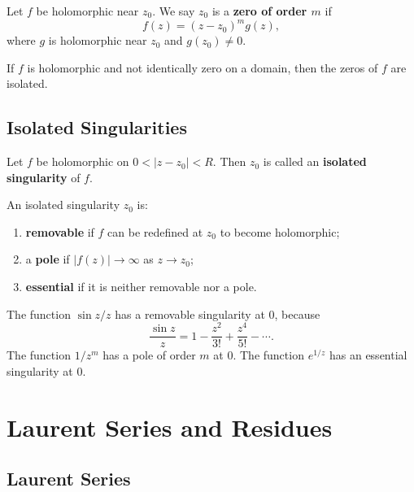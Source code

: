 \begin{definition}
Let $f$ be holomorphic near $z_0$. We say $z_0$ is a \textbf{zero of order $m$} if
\[
    f(z)=(z-z_0)^m g(z),
\]
where $g$ is holomorphic near $z_0$ and $g(z_0)\neq 0$.
\end{definition}

\begin{proposition}
If $f$ is holomorphic and not identically zero on a domain, then the zeros of $f$ are isolated.
\end{proposition}

\subsection{Isolated Singularities}

\begin{definition}
Let $f$ be holomorphic on $0<|z-z_0|<R$. Then $z_0$ is called an \textbf{isolated singularity} of $f$.
\end{definition}

\begin{definition}
An isolated singularity $z_0$ is:
\begin{enumerate}
    \item \textbf{removable} if $f$ can be redefined at $z_0$ to become holomorphic;
    \item a \textbf{pole} if $|f(z)|\to\infty$ as $z\to z_0$;
    \item \textbf{essential} if it is neither removable nor a pole.
\end{enumerate}
\end{definition}

\begin{example}
The function $\sin z/z$ has a removable singularity at $0$, because
\[
    \frac{\sin z}{z}=1-\frac{z^2}{3!}+\frac{z^4}{5!}-\cdots.
\]
The function $1/z^m$ has a pole of order $m$ at $0$. The function $e^{1/z}$ has an essential singularity at $0$.
\end{example}

\section{Laurent Series and Residues}

\subsection{Laurent Series}

